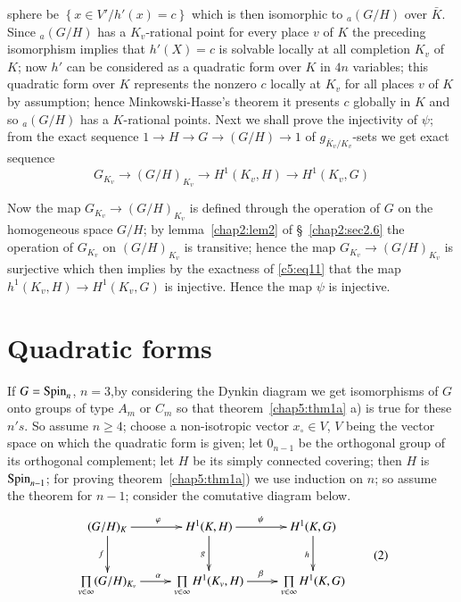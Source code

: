 sphere be $\left \{x \in V'/h' (x)=c \right \}$ which is then
isomorphic to $_a(G/H)$ over $\bar{K}$. Since $_a(G/H)$ has a
$K_v$-rational point for every place $v$ of $K$ the preceding
isomorphism implies that $h'(X)=c$ is solvable locally at all
completion $K_v$ of $K$; now $h'$ can be considered as a quadratic
form over $K$ in $4n$ variables; this quadratic form over $K$
represents the nonzero $c$ locally at $K_v$ for all places $v$ of $K$
by assumption; hence Minkowski-Hasse's theorem it presents $c$
globally in $K$ and so  $_a(G/H)$ has a $K$-rational points. Next we
shall prove the injectivity of $\psi$; from the exact sequence $1 \to
H \to G \to (G/H)\to 1$ of $g_{\bar{K}_v/K_v}$-sets we get exact
sequence 
\begin{equation*}
G_{K_v}\to (G/H)_{K_v}\to H^1 (K_v,H)\to H^1 (K_v,G) \tag{1}\label{c5:eq11}
\end{equation*} 
   
Now the map $G_{K_v} \to (G/H)_{K_v}$ is defined through the operation
of $G$ on the homogeneous space $G/H$; by lemma~\ref{chap2:lem2} of 
\S~\ref{chap2:sec2.6} the 
operation of $G_{K_v}$ on $(G/H)_{K_v}$ is transitive; hence the map
$G_{K_v} \to (G/H)_{K_v}$ is surjective which then implies by the
exactness of \eqref{c5:eq11} that the map $h^1(K_v,H)\to H^1(K_v,G)$ is
injective. Hence the map $\psi$ is injective.  
   

\section{Quadratic forms}\label{chap5:sec5.9}
   
If $G = \operatorname{Spin}_n$, $n = 3$,\pageoriginale by considering the Dynkin
diagram we get 
isomorphisms of $G$ onto groups of type $A_m$ or $C_m$ so that 
theorem~\ref{chap5:thm1a} a) is true for these $n's$. So assume $n \geq 4$; choose a
non-isotropic vector $x_\circ \in V$, $V$ being the vector space on
which the quadratic form is given; let $0_{n-1}$ be the orthogonal
group of its orthogonal complement; let $H$ be its simply connected
covering; then $H$ is $\operatorname{Spin}_{n-1}$; for proving theorem~\ref{chap5:thm1a}) 
we use induction on $n$; so assume the theorem for $n-1$; consider the
comutative diagram below.  
\begin{equation*}
\vcenter{\xymatrix{
(G/H)_K \ar[r]^\varphi \ar[d]_f & H^1 (K,H) \ar[r]^\psi \ar[d]_g & H^1
    (K,G) \ar[d]_h \\
\prod\limits_{v\in\infty} (G/H)_{K_v} \ar[r]^\alpha &
\prod\limits_{v\in\infty} H^1 (K_v, H) \ar[r]^\beta &
\prod\limits_{v\in\infty} H^1 (K,G) 
}}\tag{2}\label{c5:eq2}
\end{equation*}

